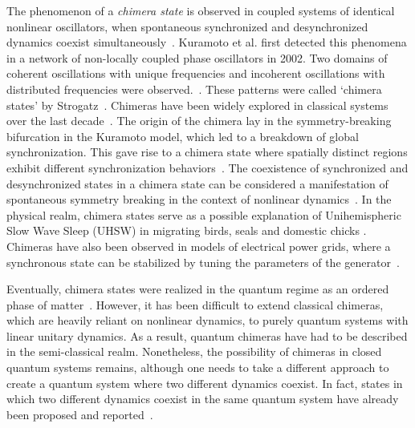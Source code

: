 \documentclass[12pt]{iopart}
\begin{document}
The phenomenon of a \textit{ chimera state} is observed in coupled systems of  identical nonlinear oscillators, when spontaneous synchronized and desynchronized dynamics coexist simultaneously~\cite{kuramoto_coexistence_2002, panaggio_chimera_2015}. Kuramoto et al. first detected this phenomena in a network of non-locally coupled phase oscillators in 2002. Two domains of coherent oscillations with unique frequencies and incoherent oscillations with distributed frequencies were observed.~\cite{kuramoto_coexistence_2002}. These patterns were called ‘chimera states’ by Strogatz~\cite{chimera:strogatz}. Chimeras have been widely explored in classical systems over the last decade~\cite{parastesh_chimeras_2021,chimera_book, taniya2022}. The origin of the chimera lay in the symmetry-breaking bifurcation in the Kuramoto model, which led to a breakdown of global synchronization. This gave rise to a chimera state where spatially distinct regions exhibit different synchronization behaviors~\cite{Kotwal2017}. The coexistence of synchronized and desynchronized states in a chimera state can be considered a manifestation of spontaneous symmetry breaking in the context of nonlinear dynamics~\cite{Aneta2013}. In the physical realm, chimera states serve as a possible explanation of Unihemispheric Slow Wave Sleep (UHSW) in migrating birds, seals and domestic chicks \cite{Rattenborg2000, Rattenborg2006, Rattenborg2016}. 
Chimeras have also been observed in models of electrical power grids, where a synchronous state can be stabilized by tuning the parameters of the generator~\cite{Deng_2024, Motter2013}. 

Eventually, chimera states were realized in the quantum regime as an ordered phase of matter~\cite{bastidas_quantum_2015}. However, it has been difficult to extend classical chimeras, which are heavily reliant on nonlinear dynamics, to purely quantum systems with linear unitary dynamics. As a result, quantum chimeras have had to be described in the semi-classical realm. Nonetheless, the possibility of chimeras in closed quantum systems remains, although one needs to take a different approach to create a quantum system where two different dynamics coexist. In fact, states in which two different dynamics coexist in the same quantum system have already been proposed and reported~\cite{Bastidas2018, Zha2020, sakurai_phys_nodate}.
\end{document}

